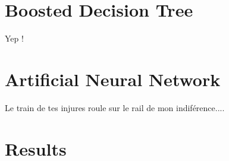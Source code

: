 \label{sec:unchapitre}

\section{Boosted Decision Tree}

Yep !

\section{Artificial Neural Network}

Le train de tes injures roule sur le rail de mon indiférence....

\section{Results}



